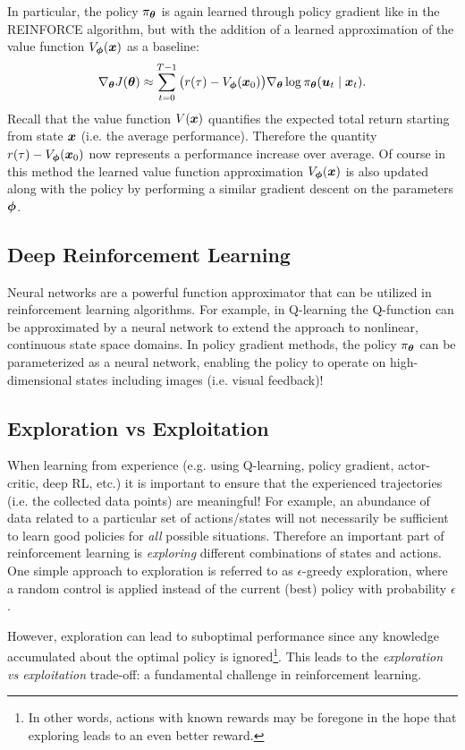 In particular, the policy $\pi_{\bm{\theta}}$ is again learned through policy gradient like in the REINFORCE algorithm, but with the addition of a learned approximation of the value function $V_{\bm{\phi}}(\bm{x})$ as a baseline:
\begin{equation*}
\nabla_{\bm{\theta}} J(\bm{\theta}) \approx \sum_{t=0}^{T-1}  \big(r(\tau) - V_{\bm{\phi}}(\bm{x}_0)\big) \nabla_{\bm{\theta}} \log \pi_{\bm{\theta}}(\bm{u}_t \mid \bm{x}_t).
\end{equation*}
Recall that the value function $V(\bm{x})$ quantifies the expected total return starting from state $\bm{x}$ (i.e. the average performance). Therefore the quantity $r(\tau) - V_{\bm{\phi}}(\bm{x}_0)$ now represents a performance increase over average. Of course in this method the learned value function approximation $V_{\bm{\phi}}(\bm{x})$ is also updated along with the policy by performing a similar gradient descent on the parameters $\bm{\phi}$.

\subsection{Deep Reinforcement Learning}
Neural networks are a powerful function approximator that can be utilized in reinforcement learning algorithms. For example, in Q-learning the Q-function can be approximated by a neural network to extend the approach to nonlinear, continuous state space domains. In policy gradient methods, the policy $\pi_{\bm{\theta}}$ can be parameterized as a neural network, enabling the policy to operate on high-dimensional states including images (i.e. visual feedback)!

\subsection{Exploration vs Exploitation}
When learning from experience (e.g. using Q-learning, policy gradient, actor-critic, deep RL, etc.) it is important to ensure that the experienced trajectories (i.e. the collected data points) are meaningful! For example, an abundance of data related to a particular set of actions/states will not necessarily be sufficient to learn good policies for \textit{all} possible situations. Therefore an important part of reinforcement learning is \textit{exploring} different combinations of states and actions. One simple approach to exploration is referred to as $\epsilon$-greedy exploration, where a random control is applied instead of the current (best) policy with probability $\epsilon$. 

However, exploration can lead to suboptimal performance since any knowledge accumulated about the optimal policy is ignored\footnote{In other words, actions with known rewards may be foregone in the hope that exploring leads to an even better reward.}. This leads to the \textit{exploration vs exploitation} trade-off: a fundamental challenge in reinforcement learning.